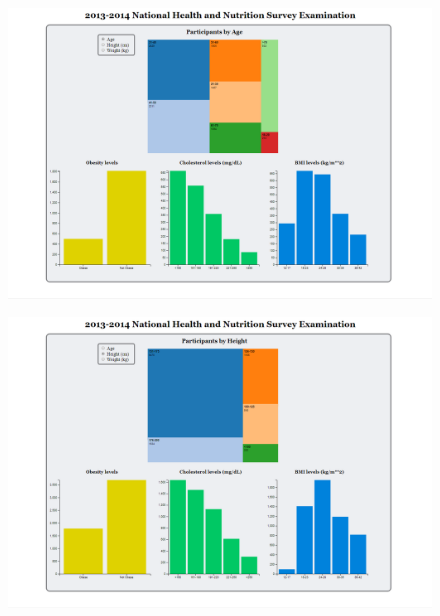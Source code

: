 \documentclass[12pt]{article}
\numberwithin{figure}{section}
\begin{document}
\newpage
 \begin{figure}[!hb]
\begin{center}
\includegraphics[scale=0.55]{CSC595P1.png}
\end{center}
\end{figure}

\newpage
 \begin{figure}[!hb]
\begin{center}
\includegraphics[scale=0.55]{CSC595P2.png}
\end{center}
\end{figure}
 \newpage



\newpage
\end{document}
